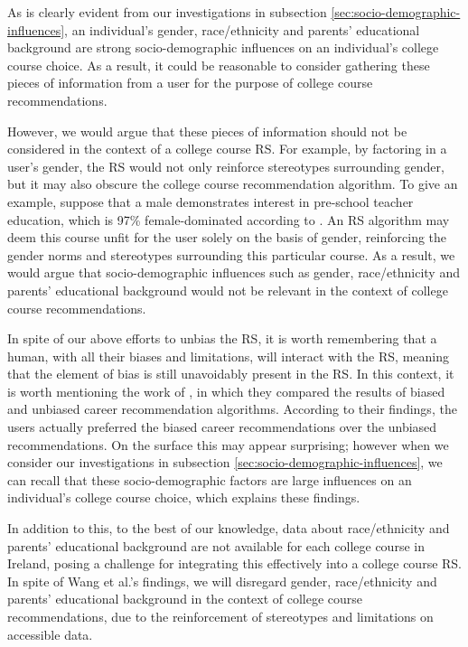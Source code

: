 As is clearly evident from our investigations in subsection \ref{sec:socio-demographic-influences},
an individual's gender, race/ethnicity and parents' educational background are strong socio-demographic influences on an individual's college course choice.
As a result, it could be reasonable to consider gathering these pieces of information from a user for the purpose of college course recommendations.

However, we would argue that these pieces of information should not be considered in the context of a college course RS.
For example, by factoring in a user's gender, the RS would not only reinforce stereotypes surrounding gender,
but it may also obscure the college course recommendation algorithm.
To give an example, suppose that a male demonstrates interest in pre-school teacher education,
which is 97\% female-dominated according to \cite{hea2024graduate}.
An RS algorithm may deem this course unfit for the user solely on the basis of gender,
reinforcing the gender norms and stereotypes surrounding this particular course.
As a result, we would argue that socio-demographic influences such as gender, race/ethnicity and parents' educational background
would not be relevant in the context of college course recommendations.

In spite of our above efforts to unbias the RS, it is worth remembering that a human, with all their biases and limitations, will interact with the RS,
meaning that the element of bias is still unavoidably present in the RS.
In this context, it is worth mentioning the work of \cite{wang2022humans}, 
in which they compared the results of biased and unbiased career recommendation algorithms.
According to their findings, 
the users actually preferred the biased career recommendations over the unbiased recommendations.
On the surface this may appear surprising; however when we consider our investigations in subsection \ref{sec:socio-demographic-influences},
we can recall that these socio-demographic factors are large influences on an individual's college course choice,
which explains these findings.

In addition to this, to the best of our knowledge, data about race/ethnicity and parents' educational background 
are not available for each college course in Ireland, posing a challenge for integrating this effectively into a college course RS.
In spite of Wang et al.'s findings, we will disregard gender, race/ethnicity and parents' educational background
in the context of college course recommendations, due to the reinforcement of stereotypes and limitations on accessible data.

